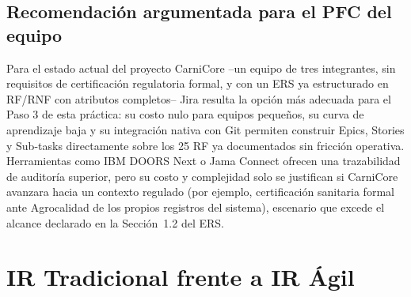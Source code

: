 \documentclass[11pt,a4paper]{article}
\begin{document}
\subsection{Recomendación argumentada para el PFC del equipo}
Para el estado actual del proyecto CarniCore --un equipo de tres integrantes, sin requisitos de certificación regulatoria formal, y con un ERS ya estructurado en RF/RNF con atributos completos-- Jira resulta la opción más adecuada para el Paso 3 de esta práctica: su costo nulo para equipos pequeños, su curva de aprendizaje baja y su integración nativa con Git permiten construir Epics, Stories y Sub-tasks directamente sobre los 25 RF ya documentados sin fricción operativa. Herramientas como IBM DOORS Next o Jama Connect ofrecen una trazabilidad de auditoría superior, pero su costo y complejidad solo se justifican si CarniCore avanzara hacia un contexto regulado (por ejemplo, certificación sanitaria formal ante Agrocalidad de los propios registros del sistema), escenario que excede el alcance declarado en la Sección~1.2 del ERS.

\section{IR Tradicional frente a IR Ágil}
\label{sec:ir-tradicional-agil}
\end{document}

